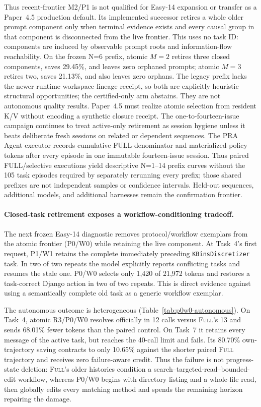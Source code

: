 \documentclass[11pt]{article}
\begin{document}
Thus recent-frontier M2/P1 is not qualified for Easy-14 expansion or transfer
as a Paper~4.5 production default.  Its implemented successor retires a whole
older prompt component only when terminal evidence exists and every causal
group in that component is disconnected from the live frontier.  This uses no
task ID: components are induced by observable prompt roots and information-flow
reachability.  On the frozen N=6 prefix, atomic $M=2$ retires three closed
components, saves 29.45\%, and leaves zero orphaned prompts; atomic $M=3$
retires two, saves 21.13\%, and also leaves zero orphans.  The legacy prefix
lacks the newer runtime workspace-lineage receipt, so both are explicitly
heuristic structural opportunities; the certified-only arm abstains.  They are
not autonomous quality results.  Paper~4.5 must realize atomic selection from
resident K/V without encoding a synthetic closure receipt.  The
one-to-fourteen-issue campaign continues to treat active-only retirement as session
hygiene unless it beats deliberate fresh sessions on related or dependent
sequences.  The PRA Agent executor records cumulative FULL-denominator and
materialized-policy tokens after every episode in one immutable fourteen-issue
session.  Thus paired FULL/selective executions yield descriptive N=1--14
prefix curves without the 105 task episodes required by separately rerunning
every prefix; those shared prefixes are not independent samples or confidence
intervals.  Held-out sequences, additional models, and additional harnesses
remain the confirmation frontier.

\paragraph{Closed-task retirement exposes a workflow-conditioning tradeoff.}
The next frozen Easy-14 diagnostic removes protocol/workflow exemplars from
the atomic frontier (P0/W0) while retaining the live component.  At Task~4's
first request, P1/W1 retains the complete immediately preceding
\texttt{KBinsDiscretizer} task.  In two of two repeats the model explicitly
reports conflicting tasks and resumes the stale one.  P0/W0 selects only
1,420 of 21,972 tokens and restores a task-correct Django action in two of two
repeats.  This is direct evidence against using a semantically complete old
task as a generic workflow exemplar.

The autonomous outcome is heterogeneous (Table~\ref{tab:p0w0-autonomous}).
On Task~4, atomic R3/P0/W0 resolves officially in 12 calls versus
\textsc{Full}'s 13 and sends 68.01\% fewer tokens than the paired control.
On Task~7 it retains every message of the active task, but reaches the 40-call
limit and fails.  Its 80.70\% own-trajectory saving contracts to only 10.65\%
against the shorter paired \textsc{Full} trajectory and receives zero
failure-aware credit.  Thus the failure is not progress-state deletion:
\textsc{Full}'s older histories condition a search--targeted-read--bounded-edit
workflow, whereas P0/W0 begins with directory listing and a whole-file read,
then globally edits every matching method and spends the remaining horizon
repairing the damage.
\end{document}
